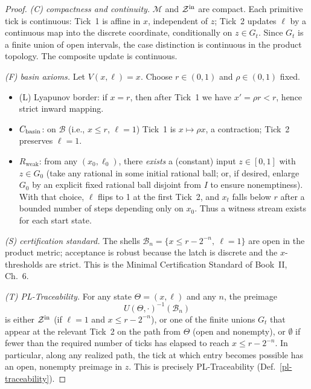 \documentclass[12pt]{article}
\theoremstyle{definition}
\theoremstyle{plain}
\begin{document}
\begin{proof}
\emph{(C) compactness and continuity.}
\(\mathcal M\) and \(\mathcal Z^{\rm in}\) are compact. Each primitive tick is continuous:
Tick~1 is affine in \(x\), independent of \(z\); Tick~2 updates \(\ell\) by a continuous map into
the discrete coordinate, conditionally on \(z\in G_t\). Since \(G_t\) is a finite union of open
intervals, the case distinction is continuous in the product topology. The composite update is continuous.

\emph{(F) basin axioms.}
Let \(V(x,\ell)=x\). Choose \(r\in(0,1)\) and \(\rho\in(0,1)\) fixed.
\begin{itemize}
  \item (L) Lyapunov border: if \(x=r\), then after Tick~1 we have \(x'=\rho r<r\), hence strict inward mapping.
  \item \(C_{\rm basin}\): on \(\mathcal B\) (i.e., \(x\le r\), \(\ell=1\)) Tick~1 is \(x\mapsto \rho x\), a contraction; Tick~2 preserves \(\ell=1\).
  \item \(R_{\mathrm{weak}}\): from any \((x_0,\ell_0)\), there \emph{exists} a (constant) input \(z\in[0,1]\) with \(z\in G_0\) (take any rational in some initial rational ball; or, if desired, enlarge \(G_0\) by an explicit fixed rational ball disjoint from \(I\) to ensure nonemptiness). With that choice, \(\ell\) flips to 1 at the first Tick~2, and \(x_t\) falls below \(r\) after a bounded number of steps depending only on \(x_0\). Thus a witness stream exists for each start state.%
\end{itemize}

\emph{(S) certification standard.}
The shells \(\mathcal B_n=\{x\le r-2^{-n},\ \ell=1\}\) are open in the product metric; acceptance is robust because the latch is discrete and the \(x\)-thresholds are strict. This is the Minimal Certification Standard of Book~II, Ch.~6.

\emph{(T) PL-Traceability.}
For any state \(\Theta=(x,\ell)\) and any \(n\), the preimage
\[
U(\Theta,\cdot)^{-1}(\mathcal B_n)
\]
is either \(\mathcal Z^{\rm in}\) (if \(\ell=1\) and \(x\le r-2^{-n}\)), or one of the finite unions \(G_t\)
that appear at the relevant Tick~2 on the path from \(\Theta\) (open and nonempty), or \(\emptyset\) if fewer than
the required number of ticks has elapsed to reach \(x\le r-2^{-n}\). In particular, along any realized path, the tick at which entry becomes possible has an open, nonempty preimage in \(z\). This is precisely PL-Traceability (Def.~\ref{pl-traceability}).


\end{proof}
\end{document}
